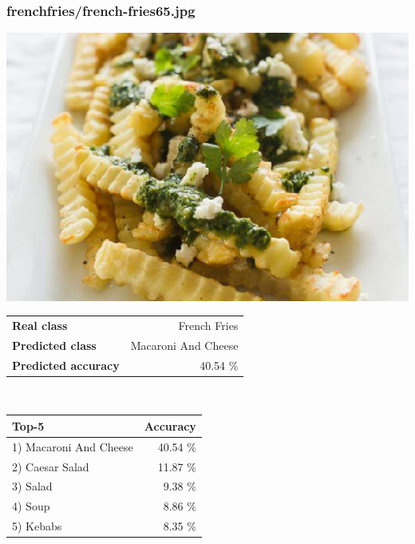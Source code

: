 \subsubsection{french\textunderscore fries/french-fries65.jpg}

\begin{minipage}[t]{0.4\textwidth}
	\vspace{0pt}
	\includegraphics[width=\linewidth]{images/evaluation-images/french_fries/french-fries65.jpg}
\end{minipage}
\hfill
\begin{minipage}[t]{0.5\textwidth}
	\vspace{0pt}\raggedright
	\begin{tabularx}{\textwidth}{X r}
		\small \textbf{Real class} & \small French Fries\\
		\small \textbf{Predicted class} & \small Macaroni And Cheese\\
		\small \textbf{Predicted accuracy} & \small 40.54 \%
    \end{tabularx}\\
    
    \vspace{6pt}
	\begin{tabularx}{\textwidth}{X r}
        \small \textbf{Top-5} & \small \textbf{Accuracy} \\
        \hline
		\small 1) Macaroni And Cheese & \small 40.54 \%\\\small 2) Caesar Salad & \small 11.87 \%\\\small 3) Salad & \small 9.38 \%\\\small 4) Soup & \small 8.86 \%\\\small 5) Kebabs & \small 8.35 \%
    \end{tabularx}
\end{minipage}
    
